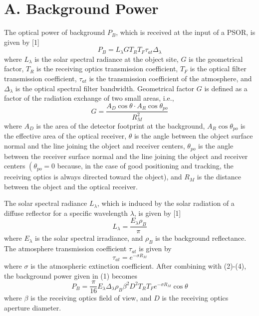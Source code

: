 \documentclass[10pt]{article}
\begin{document}
\section{A. Background Power}
The optical power of background \(P_{B}\), which is received at the input of a PSOR, is given by [1]
\[
P_{B}=L_{\lambda} G T_{R} T_{F} \tau_{a t} \Delta_{\lambda}
\]
where \(L_{\lambda}\) is the solar spectral radiance at the object site, \(G\) is the geometrical factor, \(T_{R}\) is the receiving optics transmission coefficient, \(T_{F}\) is the optical filter transmission coefficient, \(\tau_{a t}\) is the transmission coefficient of the atmosphere, and \(\Delta_{\lambda}\) is the optical spectral filter bandwidth. Geometrical factor \(G\) is defined as a factor of the radiation exchange of two small areas, i.e.,
\[
G=\frac{A_{D} \cos \theta \cdot A_{R} \cos \theta_{p o}}{R_{M}^{2}}
\]
where \(A_{D}\) is the area of the detector footprint at the background, \(A_{R} \cos \theta_{p o}\) is the effective area of the optical receiver, \(\theta\) is the angle between the object surface normal and the line joining the object and receiver centers, \(\theta_{p o}\) is the angle between the receiver surface normal and the line joining the object and receiver centers \(\left(\theta_{p o}=0\right.\) because, in the case of good positioning and tracking, the receiving optics is always directed toward the object), and \(R_{M}\) is the distance between the object and the optical receiver.

The solar spectral radiance \(L_{\lambda}\), which is induced by the solar radiation of a diffuse reflector for a specific wavelength \(\lambda\), is given by [1]
\[
L_{\lambda}=\frac{E_{\lambda} \rho_{B}}{\pi}
\]
where \(E_{\lambda}\) is the solar spectral irradiance, and \(\rho_{B}\) is the background reflectance. The atmosphere transmission coefficient \(\tau_{a t}\) is given by
\[
\tau_{a t}=e^{-\sigma R_{M}}
\]
where \(\sigma\) is the atmospheric extinction coefficient. After combining with (2)-(4), the background power given in (1) becomes
\[
P_{B}=\frac{\pi}{16} E_{\lambda} \Delta_{\lambda} \rho_{B} \beta^{2} D^{2} T_{R} T_{F} e^{-\sigma R_{M}} \cos \theta
\]
where \(\beta\) is the receiving optics field of view, and \(D\) is the receiving optics aperture diameter.
\end{document}
